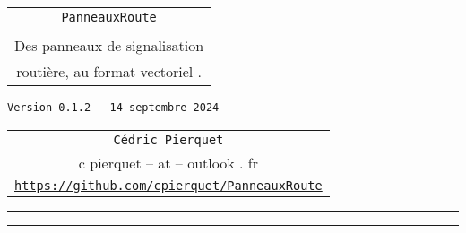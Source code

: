 \documentclass[french,11pt,a4paper]{article}
\def\TPversion{0.1.2}
\def\TPdate{14 septembre 2024}
\begin{document}
\pagestyle{fancy}

\thispagestyle{empty}

\begin{center}
	\begin{minipage}{0.75\linewidth}
	\begin{tcolorbox}[colframe=yellow,colback=yellow!15]
		\begin{center}
			\begin{tabular}{c}
				{\Huge \texttt{PanneauxRoute}}\\
				\\
				{\LARGE Des panneaux de signalisation} \\
				{\LARGE routière, au format vectoriel .} \\
			\end{tabular}
			
			\medskip
			
			{\small \texttt{Version \TPversion{} -- \TPdate}}
		\end{center}
	\end{tcolorbox}
\end{minipage}
\end{center}

\begin{center}
	\begin{tabular}{c}
	\texttt{Cédric Pierquet}\\
	{\ttfamily c pierquet -- at -- outlook . fr}\\
	\texttt{\url{https://github.com/cpierquet/PanneauxRoute}}
\end{tabular}
\end{center}

\hrule


\hypertarget{matoc}{}

\tableofcontents

\vspace*{5mm}

\hrule

\vspace*{5mm}

\vfill

\hfill
\prPassNivVap[height=4cm]~~~~
\hfill~

\medskip

\hfill
\prDebAutor[scale=0.25]
\hfill~

\vfill~

\pagebreak
\end{document}
